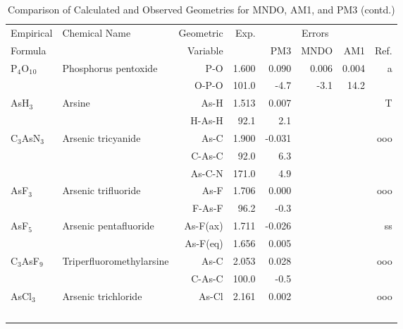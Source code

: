 \begin{table}
\caption{\label{geotabu}Comparison of Calculated and Observed Geometries for 
MNDO, AM1, and PM3 (contd.)}
\begin{center}
\compresstable
\begin{tabular}{llrrrrrr}
 Empirical  & Chemical Name &  Geometric &  Exp. & \multicolumn{3}{c}{Errors} & \\
  Formula   &               &  Variable &        & PM3  & MNDO  &  AM1 & Ref.\\
\hline
 P$_4$O$_1$$_0$       & Phosphorus pentoxide               &P-O            &     1.600   &     0.090 &     0.006 &     0.004 &     a \\
             &                                    &O-P-O        &     101.0   &      -4.7 &      -3.1 &      14.2   &       \\
 AsH$_3$        & Arsine                             &As-H           &     1.513   &     0.007 &  &  &     T \\
             &                                    &H-As-H       &      92.1   &       2.1 &  &    &       \\
 C$_3$AsN$_3$      & Arsenic tricyanide                 &As-C           &     1.900   &    -0.031 &  &  &   ooo \\
             &                                    &C-As-C       &      92.0   &       6.3 &  &    &       \\
             &                                    &As-C-N       &     171.0   &       4.9 &  &    &       \\
 AsF$_3$        & Arsenic trifluoride                &As-F           &     1.706   &     0.000 &  &  &   ooo \\
             &                                    &F-As-F       &      96.2   &      -0.3 &  &    &       \\
 AsF$_5$        & Arsenic pentafluoride              &As-F(ax)       &     1.711   &    -0.026 &  &  &    ss \\
             &                                    &As-F(eq)       &     1.656   &     0.005 &  &  &       \\
 C$_3$AsF$_9$      & Triperfluoromethylarsine           &As-C           &     2.053   &     0.028 &  &  &   ooo \\
             &                                    &C-As-C       &     100.0   &      -0.5 &  &    &       \\
 AsCl$_3$       & Arsenic trichloride                &As-Cl          &     2.161   &     0.002 &  &  &   ooo \\
$$
\end{tabular}
\end{center}
\end{table}
